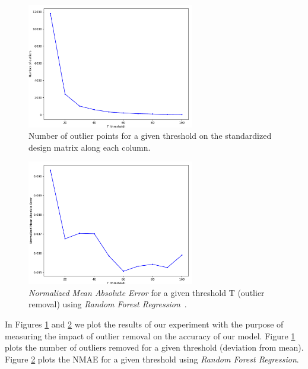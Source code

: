 \documentclass[10pt]{article}
\begin{document}
\begin{figure}[h!]
    \centering
    \captionsetup{justification=centering}
    \includegraphics[width=0.65\textwidth,height=\textheight,keepaspectratio]{../result/project1/number_outliers.pdf}
    \caption{Number of outlier points for a given threshold on the standardized design matrix along each column.}
    \label{fig:7}
\end{figure}

\begin{figure}[h!]
    \centering
    \captionsetup{justification=centering}
    \includegraphics[width=0.65\textwidth,height=\textheight,keepaspectratio]{../result/project1/nmae_outliers.pdf}
    \caption{\textit{Normalized Mean Absolute Error} for a given threshold T (outlier removal) using \textit{Random Forest Regression}~\cite{RFR}.}
    \label{fig:8}
\end{figure}

In Figures \ref{fig:7} and \ref{fig:8} we plot the results of our experiment with the purpose of measuring the impact of outlier removal on the accuracy of our model. Figure \ref{fig:7} plots the number of outliers removed for a given threshold (deviation from mean). Figure \ref{fig:8} plots the \textsc{NMAE} for a given threshold using \textit{Random Forest Regression}.
\end{document}
